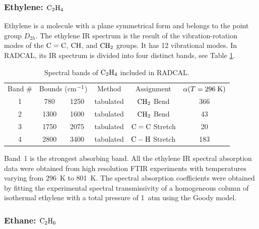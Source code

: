 \subsubsection{Ethylene: $\rm C_2H_4$}

Ethylene is a molecule with a plane symmetrical form and belongs to the point group $D_{2h}$. The ethylene IR spectrum is the result of the vibration-rotation modes of the $\rm C=C$, $\rm CH$, and $\rm CH_2$ groups. It has 12 vibrational modes. In RADCAL, its IR spectrum is divided into four distinct bands, see Table \ref{Table::C2H4}.
\begin{table}[ht]
    \centering
    \caption{Spectral bands of $\rm C_2H_4$ included in RADCAL.}
    \vspace{0.1in}
    \label{Table::C2H4}
    \begin{tabular}{|c|c|c|c|c|c|}
      \hline
      Band \# & \multicolumn{2}{|l|}{Bounds (cm$\rm ^{-1}$) } & Method & Assignment & $\alpha(T=296 \; {\rm K})$\\
      \cline{1-6}
      1 & 780  & 1250 & tabulated &  $\rm CH_2$ Bend      & 366 \\
      2 & 1300 & 1600 & tabulated &  $\rm CH_2$ Bend      & 43\\
      3 & 1750 & 2075 & tabulated &  $\rm C=C$  Stretch   & 20 \\
      4 & 2800 & 3400 & tabulated &  $\rm C-H$  Stretch   & 183 \\
      \hline
    \end{tabular}
\end{table}
Band~1 is the strongest absorbing band. All the ethylene IR spectral absorption data were obtained from high resolution FTIR experiments with temperatures varying from 296~K to 801~K. The spectral absorption coefficients were obtained by fitting the experimental spectral transmissivity of a homogeneous column of isothermal ethylene with a total pressure of 1~atm using the Goody model.

\subsubsection{Ethane: $\rm C_2H_6$}

